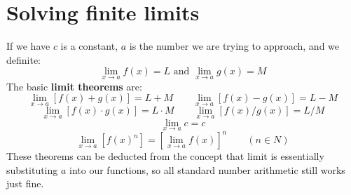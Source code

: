 \section{Solving finite limits}
If we have $c$ is a constant, $a$ is the number we are trying to approach, and we definite:
\[
    \lim_{x\to a}f(x) = L
    \text{ and }
    \lim_{x\to a}g(x) = M
\]
The basic \textbf{limit theorems} are:
\begin{equation}
    \lim_{x\to a}[f(x)+g(x)] = L+M
    \qquad
    \lim_{x\to a}[f(x)-g(x)] = L-M
\end{equation}
\begin{equation}
    \lim_{x\to a}[f(x)\cdot g(x)] = L\cdot M
    \qquad
    \lim_{x\to a}[f(x)/g(x)] = L/M
\end{equation}
\begin{equation}
    \lim_{x\to a}c = c
\end{equation}
\begin{equation}
    \lim_{x\to a} \left[f(x)^n\right]
    = \left[\lim_{x\to a}f(x)\right]^n
    \qquad
    (n \in N)
\end{equation}
These theorems can be deducted from the concept that limit is essentially substituting $a$ into our functions, so all standard number arithmetic still works just fine.

